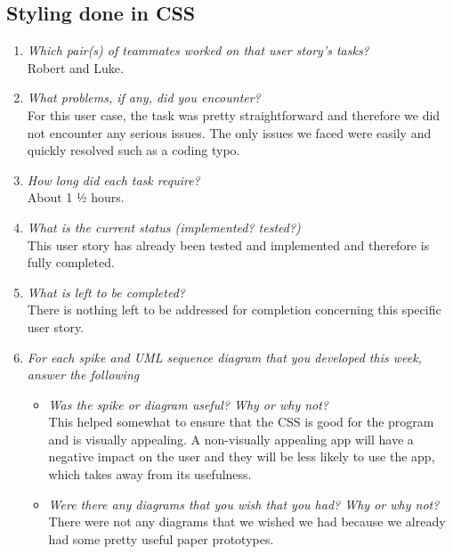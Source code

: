 \documentclass[12pt, letterpaper]{article}
\begin{document}
\subsection{Styling done in CSS}
\begin{enumerate}
	\item \emph{Which pair(s) of teammates worked on that user story's tasks?}
	\\Robert and Luke.
	\item \emph{What problems, if any, did you encounter?}
	\\For this user case, the task was pretty straightforward and therefore we did not encounter any serious issues.  The only issues we faced were easily and quickly resolved such as a coding typo.
	\item \emph{How long did each task require?}
	\\About 1 ½ hours.
	\item \emph{What is the current status (implemented? tested?)}
	\\This user story has already been tested and implemented and therefore is fully completed.
	\item \emph{What is left to be completed?}
	\\There is nothing left to be addressed for completion concerning this specific user story.
	\item \emph{For each spike and UML sequence diagram that you developed this week, answer the following}
	\begin{itemize}
		\item \emph{Was the spike or diagram useful? Why or why not?}
		\\This helped somewhat to ensure that the CSS is good for the program and is visually appealing. A non-visually appealing app will have a negative impact on the user and they will be less likely to use the app, which takes away from its usefulness.
		\item \emph{Were there any diagrams that you wish that you had? Why or why not?}
		\\There were not any diagrams that we wished we had because we already had some pretty useful paper prototypes.
	\end{itemize}
\end{enumerate}

	
	
	
\end{document}

